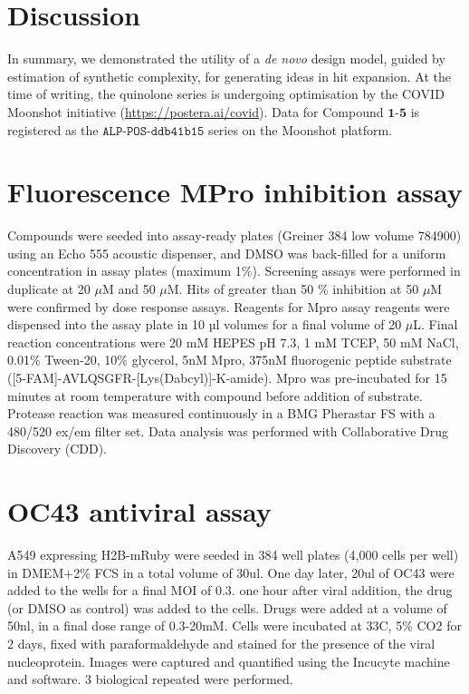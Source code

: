 \section{Discussion} \label{sec:discussion}

In summary, we demonstrated the utility of a \emph{de novo} design model, guided by estimation of synthetic complexity, for generating ideas in hit expansion. At the time of writing, the quinolone series is undergoing optimisation by the COVID Moonshot initiative (\url{https://postera.ai/covid}). Data for Compound $\mathbf{1}$-$\mathbf{5}$ is registered as the $\texttt{ALP-POS-ddb41b15}$ series on the Moonshot platform. 

\section{Fluorescence MPro inhibition assay}

Compounds were seeded into assay-ready plates (Greiner 384 low volume 784900) using an Echo 555 acoustic dispenser, and DMSO was back-filled for a uniform concentration in assay plates (maximum 1\%). Screening assays were performed in duplicate at 20 $\mu$M and 50 $\mu$M. Hits of greater than 50 \% inhibition at 50 $\mu$M were confirmed by dose response assays. Reagents for Mpro assay reagents were dispensed into the assay plate in 10 µl volumes for a final volume of 20 $\mu$L. 
Final reaction concentrations were 20 mM HEPES pH 7.3, 1 mM TCEP, 50 mM NaCl, 0.01\% Tween-20, 10\% glycerol, 5nM Mpro, 375nM fluorogenic peptide substrate ([5-FAM]-AVLQSGFR-[Lys(Dabcyl)]-K-amide). 
Mpro was pre-incubated for 15 minutes at room temperature with compound before addition of substrate. Protease reaction was measured continuously in a BMG Pherastar FS with a 480/520 ex/em filter set. Data analysis was performed with Collaborative Drug Discovery (CDD).

\section{OC43 antiviral assay}

A549 expressing H2B-mRuby were seeded in 384 well plates (4,000 cells per well) in DMEM+2\% FCS in a total volume of 30ul. One day later, 20ul of OC43 were added to the wells for a final MOI of 0.3. one hour after viral addition, the drug (or DMSO as control) was added to the cells. Drugs were added at a volume of 50nl, in a final dose range of 0.3-20mM. Cells were incubated at 33C, 5\% CO2 for 2 days, fixed with paraformaldehyde and stained for the presence of the viral nucleoprotein. Images were captured and quantified using the Incucyte machine and software. 3 biological repeated were performed.

